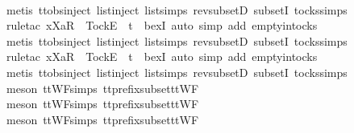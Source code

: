 \ \ \ \ \ \ \ \ \ \ \ \isamarkupfalse%
\ {\isacharparenleft}metis\ ttobs{\isachardot}inject{\isacharparenleft}{}{\isacharparenright}\ list{\isachardot}inject\ list{\isachardot}simps{\isacharparenleft}{}{\isacharparenright}\ rev{\isacharunderscore}subsetD\ subsetI\ tocks{\isachardot}simps{\isacharparenright}\isanewline
\ \ \ \ \isamarkupfalse%
\ {\isacharparenleft}rule{\isacharunderscore}tac\ x{\isacharequal}{\isachardoublequoteopen}{\isacharbrackleft}Xa{\isacharbrackright}\isactrlsub R\ {\isacharhash}\ {\isacharbrackleft}Tock{\isacharbrackright}\isactrlsub E\ {\isacharhash}\ t{\isachardoublequoteclose}\ \ bexI{\isacharcomma}\ auto\ simp\ add{\isacharcolon}\ empty{\isacharunderscore}in{\isacharunderscore}tocks{\isacharparenright}\isanewline
\ \ \ \ \isamarkupfalse%
\ {\isacharparenleft}metis\ ttobs{\isachardot}inject{\isacharparenleft}{}{\isacharparenright}\ list{\isachardot}inject\ list{\isachardot}simps{\isacharparenleft}{}{\isacharparenright}\ rev{\isacharunderscore}subsetD\ subsetI\ tocks{\isachardot}simps{\isacharparenright}\isanewline
\ \ \ \ \isamarkupfalse%
\ {\isacharparenleft}rule{\isacharunderscore}tac\ x{\isacharequal}{\isachardoublequoteopen}{\isacharbrackleft}Xa{\isacharbrackright}\isactrlsub R\ {\isacharhash}\ {\isacharbrackleft}Tock{\isacharbrackright}\isactrlsub E\ {\isacharhash}\ t{\isachardoublequoteclose}\ \ bexI{\isacharcomma}\ auto\ simp\ add{\isacharcolon}\ empty{\isacharunderscore}in{\isacharunderscore}tocks{\isacharparenright}\isanewline
\ \ \ \ \isamarkupfalse%
\ {\isacharparenleft}metis\ ttobs{\isachardot}inject{\isacharparenleft}{}{\isacharparenright}\ list{\isachardot}inject\ list{\isachardot}simps{\isacharparenleft}{}{\isacharparenright}\ rev{\isacharunderscore}subsetD\ subsetI\ tocks{\isachardot}simps{\isacharparenright}\isanewline
\ \ \ \ \isamarkupfalse%
\ {\isacharparenleft}meson\ ttWF{\isachardot}simps{\isacharparenleft}{}{}{\isacharparenright}\ tt{\isacharunderscore}prefix{\isacharunderscore}subset{\isacharunderscore}ttWF{\isacharparenright}\isanewline
\ \ \ \ \isamarkupfalse%
\ {\isacharparenleft}meson\ ttWF{\isachardot}simps{\isacharparenleft}{}{}{\isacharparenright}\ tt{\isacharunderscore}prefix{\isacharunderscore}subset{\isacharunderscore}ttWF{\isacharparenright}\isanewline
\ \ \ \ \isamarkupfalse%
\ {\isacharparenleft}meson\ ttWF{\isachardot}simps{\isacharparenleft}{}{}{\isacharparenright}\ tt{\isacharunderscore}prefix{\isacharunderscore}subset{\isacharunderscore}ttWF{\isacharparenright}\isanewline
